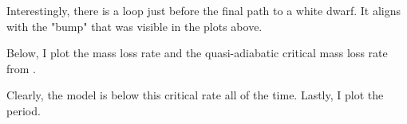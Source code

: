 \documentclass[a4paper,10pt]{article}
\begin{document}
Interestingly, there is a loop just before the final path to a white dwarf. It aligns with the "bump" that was visible in the plots above.

Below, I plot the mass loss rate and the quasi-adiabatic critical mass loss rate from \citet{temmink2022}.
\begin{figure}[ht]
    \centering
\end{figure}

Clearly, the model is below this critical rate all of the time.
Lastly, I plot the period.
\begin{figure}[ht]
    \centering
\end{figure}






\begin{figure}[ht]
    \centering
\end{figure}

\begin{figure}[ht]
    \centering
\end{figure}

\begin{figure}[ht]
    \centering
\end{figure}

\nextpage

\begin{figure}[ht]
    \centering
\end{figure}
\end{document}
